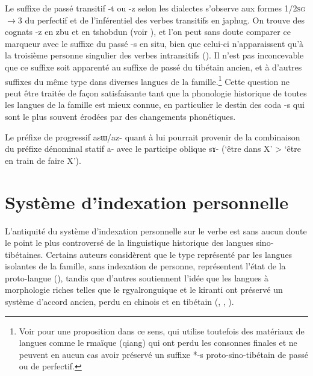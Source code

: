 \documentclass[oldfontcommands,oneside,a4paper,11pt]{article}
\newcommand{\ipa}[1]{{\phon \mbox{#1}}} %
\begin{document}
Le suffixe de passé transitif \ipa{-t} ou \ipa{-z} selon les dialectes s'observe aux formes \textsc{1/2sg}$\rightarrow$3 du perfectif et de l'inférentiel  des verbes transitifs en japhug. On trouve des cognats \ipa{-z} en zbu et en tshobdun (voir \citealt{jackson14morpho}), et l'on peut sans doute comparer ce marqueur avec le suffixe du passé \ipa{-s} en situ, bien que celui-ci n'apparaissent qu'à la troisième personne singulier des verbes intransitifs (\citealt{linyj03tense}). Il n'est pas inconcevable que ce suffixe soit apparenté au suffixe de passé du tibétain ancien, et à d'autres suffixes du même type dans diverses langues de la famille.\footnote{Voir \citet{huangbf97s.houzhui} pour une proposition dans ce sens, qui utilise toutefois des matériaux de langues comme le rmaïque (qiang) qui ont perdu les consonnes finales et ne peuvent en aucun cas avoir préservé un suffixe *-s proto-sino-tibétain de passé ou de perfectif.} Cette question ne peut être traitée de façon satisfaisante tant que la phonologie historique de toutes les langues de la famille est mieux connue, en particulier le destin des coda -s qui sont le plus souvent érodées par des changements phonétiques.

Le préfixe de progressif \ipa{asɯ/az-} quant à lui pourrait provenir de la combinaison du préfixe dénominal statif \ipa{a-} avec le participe oblique \ipa{sɤ-} (`être dans X' >  `être en train de faire X').

\section{Système d'indexation personnelle}

L'antiquité du système d'indexation personnelle sur le verbe est sans aucun doute le point le plus controversé de la linguistique historique des langues sino-tibétaines. Certains auteurs considèrent que le type représenté par les langues isolantes de la famille, sans indexation de personne, représentent l'état de la proto-langue (\citealt{lapolla92, lapolla03, lapolla12comments, zeisler15eat}), tandis que d'autres soutiennent l'idée que les langues à morphologie riches telles que le rgyalronguique et le kiranti ont préservé un système d'accord ancien, perdu en chinois et en tibétain (\citealt{bauman75}, \citealt{driem93agreement, delancey89agreement, delancey10agreement, delancey11prefixes, delancey14second}, \citealt{jacques10zos, jacques12agreement}).
   
\end{document}
